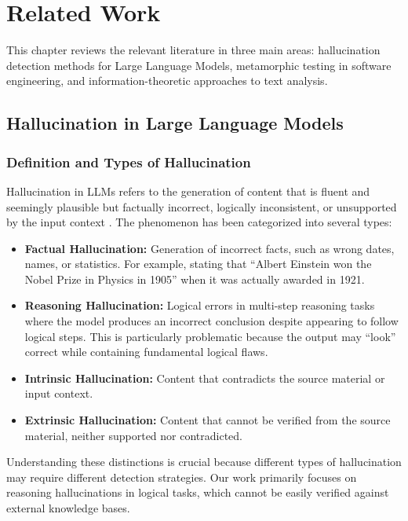 \chapter{Related Work}

This chapter reviews the relevant literature in three main areas: hallucination detection methods for Large Language Models, metamorphic testing in software engineering, and information-theoretic approaches to text analysis.

\section{Hallucination in Large Language Models}

\subsection{Definition and Types of Hallucination}

Hallucination in LLMs refers to the generation of content that is fluent and seemingly plausible but factually incorrect, logically inconsistent, or unsupported by the input context \cite{ji2023survey}. The phenomenon has been categorized into several types:

\begin{itemize}
    \item \textbf{Factual Hallucination:} Generation of incorrect facts, such as wrong dates, names, or statistics. For example, stating that ``Albert Einstein won the Nobel Prize in Physics in 1905'' when it was actually awarded in 1921.

    \item \textbf{Reasoning Hallucination:} Logical errors in multi-step reasoning tasks where the model produces an incorrect conclusion despite appearing to follow logical steps. This is particularly problematic because the output may ``look'' correct while containing fundamental logical flaws.

    \item \textbf{Intrinsic Hallucination:} Content that contradicts the source material or input context.

    \item \textbf{Extrinsic Hallucination:} Content that cannot be verified from the source material, neither supported nor contradicted.
\end{itemize}

Understanding these distinctions is crucial because different types of hallucination may require different detection strategies. Our work primarily focuses on reasoning hallucinations in logical tasks, which cannot be easily verified against external knowledge bases.

